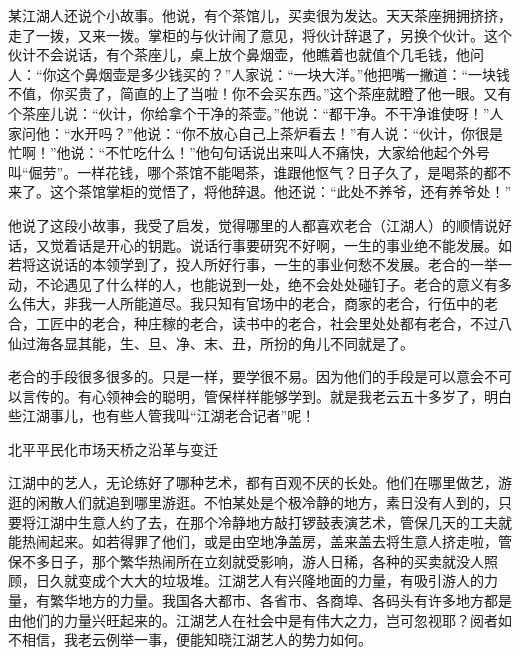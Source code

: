 \documentclass[12pt,UTF8]{ctexbook}
\begin{document}
某江湖人还说个小故事。他说，有个茶馆儿，买卖很为发达。天天茶座拥拥挤挤，走了一拨，又来一拨。掌柜的与伙计闹了意见，将伙计辞退了，另换个伙计。这个伙计不会说话，有个茶座儿，桌上放个鼻烟壶，他瞧着也就值个几毛钱，他问人：“你这个鼻烟壶是多少钱买的？”人家说：“一块大洋。”他把嘴一撇道：“一块钱不值，你买贵了，简直的上了当啦！你不会买东西。”这个茶座就瞪了他一眼。又有个茶座儿说：“伙计，你给拿个干净的茶壶。”他说：“都干净。不干净谁使呀！”人家问他：“水开吗？”他说：“你不放心自己上茶炉看去！”有人说：“伙计，你很是忙啊！”他说：“不忙吃什么！”他句句话说出来叫人不痛快，大家给他起个外号叫“倔劳”。一样花钱，哪个茶馆不能喝茶，谁跟他怄气？日子久了，是喝茶的都不来了。这个茶馆掌柜的觉悟了，将他辞退。他还说：“此处不养爷，还有养爷处！”

他说了这段小故事，我受了启发，觉得哪里的人都喜欢老合（江湖人）的顺情说好话，又觉着话是开心的钥匙。说话行事要研究不好啊，一生的事业绝不能发展。如若将这说话的本领学到了，投人所好行事，一生的事业何愁不发展。老合的一举一动，不论遇见了什么样的人，也能说到一处，绝不会处处碰钉子。老合的意义有多么伟大，非我一人所能道尽。我只知有官场中的老合，商家的老合，行伍中的老合，工匠中的老合，种庄稼的老合，读书中的老合，社会里处处都有老合，不过八仙过海各显其能，生、旦、净、末、丑，所扮的角儿不同就是了。

老合的手段很多很多的。只是一样，要学很不易。因为他们的手段是可以意会不可以言传的。有心领神会的聪明，管保样样能够学到。就是我老云五十多岁了，明白些江湖事儿，也有些人管我叫“江湖老合记者”呢！





北平平民化市场天桥之沿革与变迁


江湖中的艺人，无论练好了哪种艺术，都有百观不厌的长处。他们在哪里做艺，游逛的闲散人们就追到哪里游逛。不怕某处是个极冷静的地方，素日没有人到的，只要将江湖中生意人约了去，在那个冷静地方敲打锣鼓表演艺术，管保几天的工夫就能热闹起来。如若得罪了他们，或是由空地净盖房，盖来盖去将生意人挤走啦，管保不多日子，那个繁华热闹所在立刻就受影响，游人日稀，各种的买卖就没人照顾，日久就变成个大大的垃圾堆。江湖艺人有兴隆地面的力量，有吸引游人的力量，有繁华地方的力量。我国各大都市、各省市、各商埠、各码头有许多地方都是由他们的力量兴旺起来的。江湖艺人在社会中是有伟大之力，岂可忽视耶？阅者如不相信，我老云例举一事，便能知晓江湖艺人的势力如何。
\end{document}
